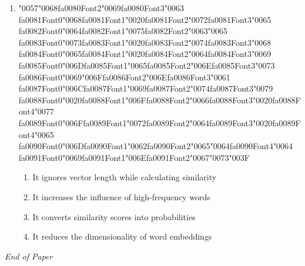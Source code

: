 \documentclass[12pt]{article}
\begin{document}
\begin{enumerate}[label=Q\arabic*.]
\item {\char"0057}{\char"0068}{\csname fa0080Font2\endcsname\char"0069}{\csname fa0080Font3\endcsname\char"0063} {\csname fa0081Font0\endcsname\char"0068}{\csname fa0081Font1\endcsname\char"0020}{\csname fa0081Font2\endcsname\char"0072}{\csname fa0081Font3\endcsname\char"0065} {\csname fa0082Font0\endcsname\char"0064}{\csname fa0082Font1\endcsname\char"0075}{\csname fa0082Font2\endcsname\char"0063}{\char"0065} {\csname fa0083Font0\endcsname\char"0073}{\csname fa0083Font1\endcsname\char"0020}{\csname fa0083Font2\endcsname\char"0074}{\csname fa0083Font3\endcsname\char"0068} {\csname fa0084Font0\endcsname\char"0065}{\csname fa0084Font1\endcsname\char"0020}{\csname fa0084Font2\endcsname\char"0064}{\csname fa0084Font3\endcsname\char"0069} {\csname fa0085Font0\endcsname\char"006D}{\csname fa0085Font1\endcsname\char"0065}{\csname fa0085Font2\endcsname\char"006E}{\csname fa0085Font3\endcsname\char"0073} {\csname fa0086Font0\endcsname\char"0069}{\char"006F}{\csname fa0086Font2\endcsname\char"006E}{\csname fa0086Font3\endcsname\char"0061} {\csname fa0087Font0\endcsname\char"006C}{\csname fa0087Font1\endcsname\char"0069}{\csname fa0087Font2\endcsname\char"0074}{\csname fa0087Font3\endcsname\char"0079} {\csname fa0088Font0\endcsname\char"0020}{\csname fa0088Font1\endcsname\char"006F}{\csname fa0088Font2\endcsname\char"0066}{\csname fa0088Font3\endcsname\char"0020}{\csname fa0088Font4\endcsname\char"0077} {\csname fa0089Font0\endcsname\char"006F}{\csname fa0089Font1\endcsname\char"0072}{\csname fa0089Font2\endcsname\char"0064}{\csname fa0089Font3\endcsname\char"0020}{\csname fa0089Font4\endcsname\char"0065} {\csname fa0090Font0\endcsname\char"006D}{\csname fa0090Font1\endcsname\char"0062}{\csname fa0090Font2\endcsname\char"0065}{\char"0064}{\csname fa0090Font4\endcsname\char"0064} {\csname fa0091Font0\endcsname\char"0069}{\csname fa0091Font1\endcsname\char"006E}{\csname fa0091Font2\endcsname\char"0067}{\char"0073}{\char"003F}
\begin{enumerate}[label=(\Alph*)]
    \item It ignores vector length while calculating similarity
    \item It increases the influence of high-frequency words
    \item It converts similarity scores into probabilities
    \item It reduces the dimensionality of word embeddings
\end{enumerate}
\end{enumerate}

\vfill
\noindent\textit{End of Paper}
\end{document}
